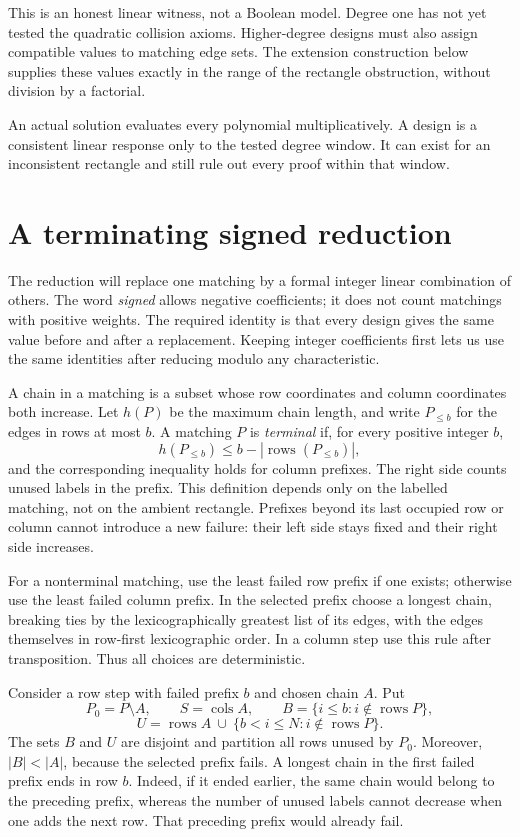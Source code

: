 This is an honest linear witness, not a Boolean model. Degree one has
not yet tested the quadratic collision axioms. Higher-degree designs
must also assign compatible values to matching edge sets. The extension
construction below supplies these values exactly in the range of the
rectangle obstruction, without division by a factorial.

\begin{checkpoint}
An actual solution evaluates every polynomial multiplicatively. A design
is a consistent linear response only to the tested degree window. It
can exist for an inconsistent rectangle and still rule out every proof
within that window.
\end{checkpoint}

\section{A terminating signed reduction}
The reduction will replace one matching by a formal integer linear
combination of others. The word \emph{signed} allows negative
coefficients; it does not count matchings with positive weights.
The required identity is that every design gives the same value before
and after a replacement. Keeping integer coefficients first lets us
use the same identities after reducing modulo any characteristic.


A chain in a matching is a subset whose row coordinates and column
coordinates both increase.  Let $h(P)$ be the maximum chain length, and
write $P_{\leq b}$ for the edges in rows at most $b$.  A matching $P$ is
\emph{terminal} if, for every positive integer $b$,
\[
 h(P_{\leq b})\leq b-|\operatorname{rows}(P_{\leq b})|,
\]
and the corresponding inequality holds for column prefixes.  The right
side counts unused labels in the prefix.  This definition depends only
on the labelled matching, not on the ambient rectangle.  Prefixes beyond
its last occupied row or column cannot introduce a new failure: their
left side stays fixed and their right side increases.

For a nonterminal matching, use the least failed row prefix if one exists;
otherwise use the least failed column prefix.  In the selected prefix
choose a longest chain, breaking ties by the lexicographically greatest
list of its edges, with the edges themselves in row-first lexicographic
order.  In a column step use this rule after transposition.  Thus all
choices are deterministic.

Consider a row step with failed prefix $b$ and chosen chain $A$.  Put
\[
 P_0=P\setminus A,\qquad S=\operatorname{cols}A,\qquad
 B=\{i\leq b:i\notin\operatorname{rows}P\},
\]
\[
 U=\operatorname{rows}A\ \cup\
       \{b<i\leq N:i\notin\operatorname{rows}P\}.
\]
The sets $B$ and $U$ are disjoint and partition all rows unused by $P_0$.
Moreover, $|B|<|A|$, because the selected prefix fails.  A longest chain
in the first failed prefix ends in row $b$.  Indeed, if it ended earlier,
the same chain would belong to the preceding prefix, whereas the number
of unused labels cannot decrease when one adds the next row.  That
preceding prefix would already fail.

